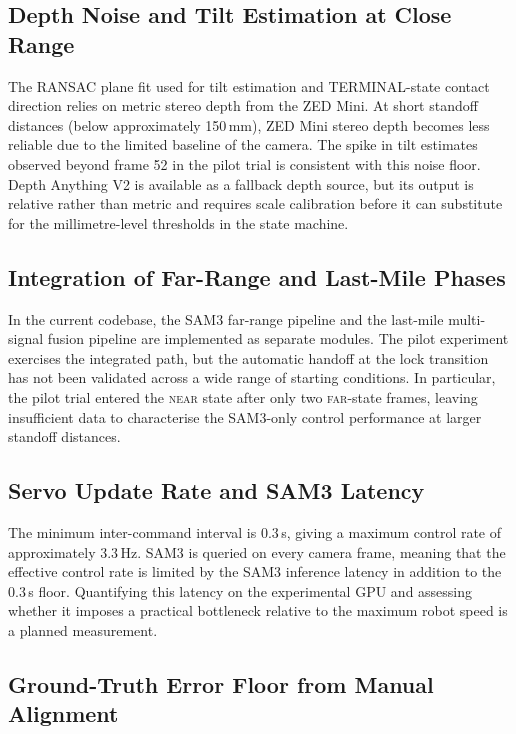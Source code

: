 \documentclass[lettersize,journal]{IEEEtran}
\begin{document}
\subsection{Depth Noise and Tilt Estimation at Close Range}

The RANSAC plane fit used for tilt estimation and TERMINAL-state contact
direction relies on metric stereo depth from the ZED Mini.  At short
standoff distances (below approximately 150\,mm), ZED Mini stereo depth
becomes less reliable due to the limited baseline of the camera.  The
spike in tilt estimates observed beyond frame 52 in the pilot trial is
consistent with this noise floor.  Depth Anything V2 is available as a
fallback depth source, but its output is relative rather than metric and
requires scale calibration before it can substitute for the millimetre-level
thresholds in the state machine.

\subsection{Integration of Far-Range and Last-Mile Phases}

In the current codebase, the SAM3 far-range pipeline and the last-mile
multi-signal fusion pipeline are implemented as separate modules.  The pilot
experiment exercises the integrated path, but the automatic handoff at the
lock transition has not been validated across a wide range of starting
conditions.  In particular, the pilot trial entered the \textsc{near} state
after only two \textsc{far}-state frames, leaving insufficient data to
characterise the SAM3-only control performance at larger standoff distances.

\subsection{Servo Update Rate and SAM3 Latency}

The minimum inter-command interval is $0.3$\,s, giving a maximum control
rate of approximately $3.3$\,Hz.  SAM3 is queried on every camera frame,
meaning that the effective control rate is limited by the SAM3 inference
latency in addition to the $0.3$\,s floor.  Quantifying this latency on
the experimental GPU and assessing whether it imposes a practical bottleneck
relative to the maximum robot speed is a planned measurement.

\subsection{Ground-Truth Error Floor from Manual Alignment}
\end{document}
